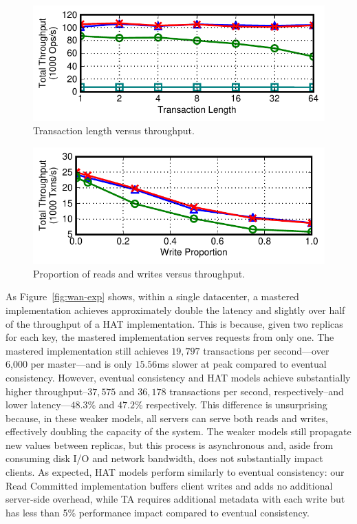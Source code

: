 \begin{figure}[t!]
\begin{center}
\includegraphics[width=0.90\columnwidth]{figs/finals/txnlen-thru.pdf}
\end{center}\vspace{-2em}
\caption{Transaction length versus throughput.}
\label{fig:txlen}
\end{figure}

\begin{figure}[t!]
\begin{center}
\includegraphics[width=0.90\columnwidth]{figs/finals/wprop-thru.pdf}
\end{center}\vspace{-2em}
\caption{Proportion of reads and writes versus throughput.}
\label{fig:rprop}
\end{figure}


As Figure~\ref{fig:wan-exp} shows, within a single datacenter, a
mastered implementation achieves approximately double the latency and
slightly over half of the throughput of a HAT implementation. This is
because, given two replicas for each key, the mastered implementation
serves requests from only one. The mastered implementation still
achieves $19,797$ transactions per second---over 6,000 per
master---and is only $15.56$ms slower at peak compared to eventual
consistency. However, eventual consistency and HAT models achieve
substantially higher throughput--$37,575$ and $36,178$ transactions
per second, respectively--and lower latency---$48.3\%$ and $47.2\%$
respectively. This difference is unsurprising because, in these weaker
models, all servers can serve both reads and writes, effectively
doubling the capacity of the system. The weaker models still propagate
new values between replicas, but this process is asynchronous and,
aside from consuming disk I/O and network bandwidth, does not
substantially impact clients. As expected, HAT models perform
similarly to eventual consistency: our Read Committed implementation
buffers client writes and adds no additional server-side overhead,
while TA requires additional metadata with each write but has less
than 5\% performance impact compared to eventual consistency.

